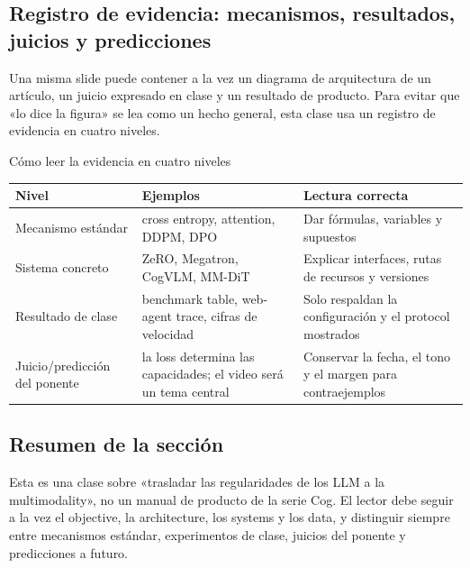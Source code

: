 \documentclass[a4paper]{article}
\begin{document}

\subsection{Registro de evidencia: mecanismos, resultados, juicios y predicciones}

Una misma slide puede contener a la vez un diagrama de arquitectura de un artículo, un juicio expresado en clase y un resultado de producto. Para evitar que «lo dice la figura» se lea como un hecho general, esta clase usa un registro de evidencia en cuatro niveles.

\begin{knowledgebox}{Cómo leer la evidencia en cuatro niveles}
\begin{tabularx}{\textwidth}{L{0.18\textwidth} L{0.31\textwidth} X}
\toprule
Nivel & Ejemplos & Lectura correcta \\
\midrule
Mecanismo estándar & cross entropy, attention, DDPM, DPO & Dar fórmulas, variables y supuestos \\
Sistema concreto & ZeRO, Megatron, CogVLM, MM-DiT & Explicar interfaces, rutas de recursos y versiones \\
Resultado de clase & benchmark table, web-agent trace, cifras de velocidad & Solo respaldan la configuración y el protocol mostrados \\
Juicio/predicción del ponente & la loss determina las capacidades; el video será un tema central & Conservar la fecha, el tono y el margen para contraejemplos \\
\bottomrule
\end{tabularx}
\end{knowledgebox}

\subsection{Resumen de la sección}

Esta es una clase sobre «trasladar las regularidades de los LLM a la multimodality», no un manual de producto de la serie Cog. El lector debe seguir a la vez el objective, la architecture, los systems y los data, y distinguir siempre entre mecanismos estándar, experimentos de clase, juicios del ponente y predicciones a futuro.
\end{document}
